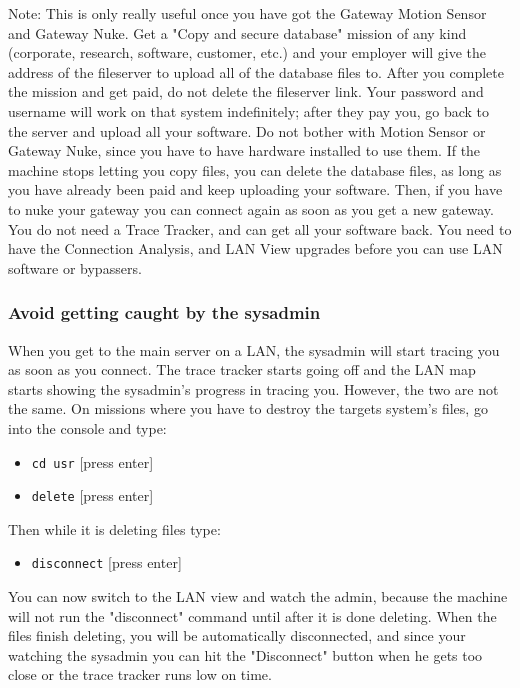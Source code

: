 \documentclass[11pt,twoside,a4paper]{book}
\begin{document}
Note: This is only really useful once you have got the Gateway Motion Sensor and Gateway Nuke. Get a "Copy and secure database" mission of any kind (corporate, research, software, customer, etc.) and your employer will give the address of the fileserver to upload all of the database files to. After you complete the mission and get paid, do not delete the fileserver link. Your password and username will work on that system indefinitely; after they pay you, go back to the server and upload all your software. Do not bother with Motion Sensor or Gateway Nuke, since you have to have hardware installed to use them. If the machine stops letting you copy files, you can delete the database files, as long as you have already been paid and keep uploading your software. Then, if you have to nuke your gateway you can connect again as soon as you get a new gateway. You do not need a Trace Tracker, and can get all your software back. You need to have the Connection Analysis, and LAN View upgrades before you can use LAN software or bypassers. 

\subsubsection{Avoid getting caught by the sysadmin}

When you get to the main server on a LAN, the sysadmin will start tracing you as soon as you connect. The trace tracker starts going off and the LAN map starts showing the sysadmin's progress in tracing you. However, the two are not the same. On missions where you have to destroy the targets system's files, go into the console and type:

\begin{itemize}
	\item[] \texttt{cd usr} [press enter]
	\item[] \texttt{delete} [press enter]
\end{itemize}

Then while it is deleting files type:

\begin{itemize}
	\item[] \texttt{disconnect} [press enter] 
\end{itemize}

You can now switch to the LAN view and watch the admin, because the machine will not run the "disconnect" command until after it is done deleting. When the files finish deleting, you will be automatically disconnected, and since your watching the sysadmin you can hit the "Disconnect" button when he gets too close or the trace tracker runs low on time. 
\end{document}
